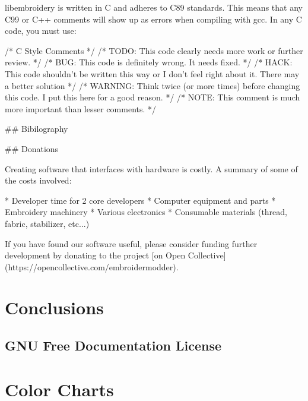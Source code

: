 \documentclass[a4paper, 11pt]{report}
\begin{document}
libembroidery is written in C and adheres to C89 standards. This means
that any C99 or C++ comments will show up as errors when compiling with
gcc. In any C code, you must use:

    /* C Style Comments */
    /* TODO: This code clearly needs more work or further review. */
    /* BUG: This code is definitely wrong. It needs fixed. */
    /* HACK: This code shouldn't be written this way or I don't feel right about it. There may a better solution */
    /* WARNING: Think twice (or more times) before changing this code. I put this here for a good reason. */
    /* NOTE: This comment is much more important than lesser comments. */

## Bibilography


## Donations

Creating software that interfaces with hardware is costly. A summary of some of the costs involved:
                    
  * Developer time for 2 core developers
  * Computer equipment and parts
  * Embroidery machinery
  * Various electronics
  * Consumable materials (thread, fabric, stabilizer, etc...)

If you have found our software useful, please consider funding further development by donating to the project [on Open Collective](https://opencollective.com/embroidermodder).



%

\chapter{Conclusions}




\appendix

\section{GNU Free Documentation License}

\chapter{Color Charts}
\end{document}

